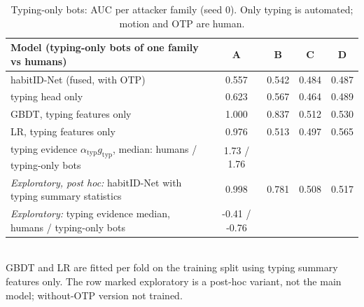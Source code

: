 \begin{table}[t]
\caption{Typing-only bots: AUC per attacker family (seed 0). Only typing is automated; motion and OTP are human.}
\label{tab:typing_diag}
\centering
\small
\begin{tabular}{lcccc}
\toprule
Model (typing-only bots of one family vs humans) & A & B & C & D \\
\midrule
habitID-Net (fused, with OTP) & 0.557 & 0.542 & 0.484 & 0.487 \\
typing head only & 0.623 & 0.567 & 0.464 & 0.489 \\
GBDT, typing features only & 1.000 & 0.837 & 0.512 & 0.530 \\
LR, typing features only & 0.976 & 0.513 & 0.497 & 0.565 \\
typing evidence $\alpha_{\text{typ}}g_{\text{typ}}$, median: humans / typing-only bots & 1.73 / 1.76 &  &  &  \\
\emph{Exploratory, post hoc:} habitID-Net with typing summary statistics & 0.998 & 0.781 & 0.508 & 0.517 \\
\emph{Exploratory:} typing evidence median, humans / typing-only bots & -0.41 / -0.76 &  &  &  \\
\bottomrule
\end{tabular}
\\[2pt]\footnotesize GBDT and LR are fitted per fold on the training split using typing summary features only. The row marked exploratory is a post-hoc variant, not the main model; without-OTP version not trained.
\end{table}
